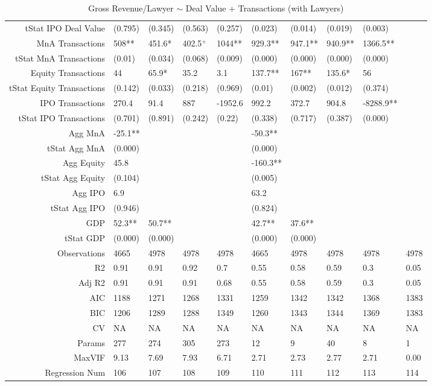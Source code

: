 \begin{table}[ht]
\begin{tabular}{rlllllllll}
  tStat IPO Deal Value & (0.795) & (0.345) & (0.563) & (0.257) & (0.023) & (0.014) & (0.019) & (0.003) &  \\ 
  MnA Transactions & 508** & 451.6* & 402.5$^{+}$ & 1044** & 929.3** & 947.1** & 940.9** & 1366.5** &  \\ 
  tStat MnA Transactions & (0.01) & (0.034) & (0.068) & (0.009) & (0.000) & (0.000) & (0.000) & (0.000) &  \\ 
  Equity Transactions & 44 & 65.9* & 35.2 & 3.1 & 137.7** & 167** & 135.6* & 56 &  \\ 
  tStat Equity Transactions & (0.142) & (0.033) & (0.218) & (0.969) & (0.01) & (0.002) & (0.012) & (0.374) &  \\ 
  IPO Transactions & 270.4 & 91.4 & 887 & -1952.6 & 992.2 & 372.7 & 904.8 & -8288.9** &  \\ 
  tStat IPO Transactions & (0.701) & (0.891) & (0.242) & (0.22) & (0.338) & (0.717) & (0.387) & (0.000) &  \\ 
  Agg MnA & -25.1** &  &  &  & -50.3** &  &  &  &  \\ 
  tStat Agg MnA & (0.000) &  &  &  & (0.000) &  &  &  &  \\ 
  Agg Equity & 45.8 &  &  &  & -160.3** &  &  &  &  \\ 
  tStat Agg Equity & (0.104) &  &  &  & (0.005) &  &  &  &  \\ 
  Agg IPO & 6.9 &  &  &  & 63.2 &  &  &  &  \\ 
  tStat Agg IPO & (0.946) &  &  &  & (0.824) &  &  &  &  \\ 
  GDP & 52.3** & 50.7** &  &  & 42.7** & 37.6** &  &  &  \\ 
  tStat GDP & (0.000) & (0.000) &  &  & (0.000) & (0.000) &  &  &  \\ 
  Observations & 4665 & 4978 & 4978 & 4978 & 4665 & 4978 & 4978 & 4978 & 4978 \\ 
  R2 & 0.91 & 0.91 & 0.92 & 0.7 & 0.55 & 0.58 & 0.59 & 0.3 & 0.05 \\ 
  Adj R2 & 0.91 & 0.91 & 0.91 & 0.68 & 0.55 & 0.58 & 0.59 & 0.3 & 0.05 \\ 
  AIC & 1188 & 1271 & 1268 & 1331 & 1259 & 1342 & 1342 & 1368 & 1383 \\ 
  BIC & 1206 & 1289 & 1288 & 1349 & 1260 & 1343 & 1344 & 1369 & 1383 \\ 
  CV & NA & NA & NA & NA & NA & NA & NA & NA & NA \\ 
  Params & 277 & 274 & 305 & 273 & 12 & 9 & 40 & 8 & 1 \\ 
  MaxVIF & 9.13 & 7.69 & 7.93 & 6.71 & 2.71 & 2.73 & 2.77 & 2.71 & 0.00 \\ 
  Regression Num & 106 & 107 & 108 & 109 & 110 & 111 & 112 & 113 & 114 \\ 
   \hline
\end{tabular}
\caption{Gross Revenue/Lawyer $\sim$ Deal Value + Transactions (with Lawyers)} 
\end{table}
